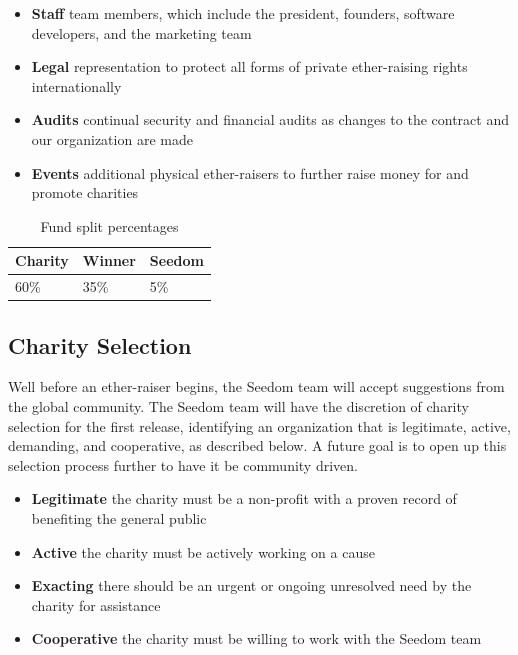 \documentclass[11pt]{article}
\begin{document}
\begin{itemize}
\item{\textbf{Staff} team members, which include the president, founders, software developers, and the marketing team}
\item{\textbf{Legal} representation to protect all forms of private ether-raising rights internationally}
\item{\textbf{Audits} continual security and financial audits as changes to the contract and our organization are made}
\item{\textbf{Events} additional physical ether-raisers to further raise money for and promote charities}
\end{itemize}

\begin{table}[H]
\begin{center}
\begin{tabular}{| l | l | l |}
\hline
\textbf{Charity} & \textbf{Winner} & \textbf{Seedom} \\ \hline
60\% & 35\%  & 5\% \\ \hline
\end{tabular}
\caption{Fund split percentages}
\label{tab:fundSplitPercentages}
\end{center}
\end{table}

\subsection{Charity Selection}

Well before an ether-raiser begins, the Seedom team will accept suggestions from the global community. The Seedom team will have the discretion of charity selection for the first release, identifying an organization that is legitimate, active, demanding, and cooperative, as described below. A future goal is to open up this selection process further to have it be community driven.

\begin{itemize}
\item{\textbf{Legitimate} the charity must be a non-profit with a proven record of benefiting the general public}
\item{\textbf{Active} the charity must be actively working on a cause}
\item{\textbf{Exacting} there should be an urgent or ongoing unresolved need by the charity for assistance}
\item{\textbf{Cooperative} the charity must be willing to work with the Seedom team}
\end{itemize}
\end{document}
